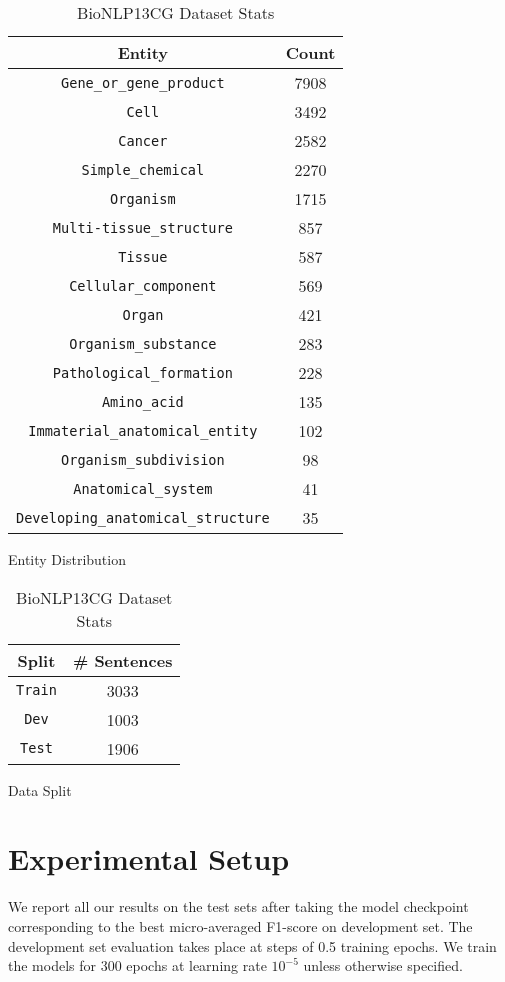 \begin{table}[h!]
\begin{subtable}[t]{.48\linewidth}
\centering
\begin{tabular}{|c|c|}\hline
	\textbf{Entity} & \textbf{Count}\\\hline
	\texttt{Gene\_or\_gene\_product} & 7908\\\hline
    \texttt{Cell} & 3492\\\hline
    \texttt{Cancer} & 2582\\\hline
    \texttt{Simple\_chemical} & 2270\\\hline
    \texttt{Organism} & 1715\\\hline
    \texttt{Multi-tissue\_structure} & 857\\\hline
    \texttt{Tissue} & 587\\\hline
    \texttt{Cellular\_component} & 569\\\hline
    \texttt{Organ} & 421\\\hline
    \texttt{Organism\_substance} & 283\\\hline
    \texttt{Pathological\_formation} & 228\\\hline
    \texttt{Amino\_acid} & 135\\\hline
    \texttt{Immaterial\_anatomical\_entity} & 102\\\hline
    \texttt{Organism\_subdivision} & 98\\\hline
    \texttt{Anatomical\_system} & 41\\\hline
    \texttt{Developing\_anatomical\_structure} & 35\\\hline
	\end{tabular}
	\caption{Entity Distribution}
	\label{tab:bio_entity_distribution}
\end{subtable}
\begin{subtable}[t]{.48\linewidth}
\centering
\begin{tabular}{|c|c|}\hline
	\textbf{Split} & \textbf{\# Sentences}\\\hline
	\texttt{Train} & 3033\\\hline
	\texttt{Dev} & 1003\\\hline
	\texttt{Test} & 1906\\\hline
	\end{tabular}
	\caption{Data Split}
	\label{tab:bio_dataset_split}
\end{subtable}
\caption{BioNLP13CG Dataset Stats}
\end{table}

\section{Experimental Setup}
We report all our results on the test sets after taking the model checkpoint corresponding to the best micro-averaged F1-score on development set. The development set evaluation takes place at steps of 0.5 training epochs. We train the models for $300$ epochs at learning rate $10^{-5}$ unless otherwise specified. 

